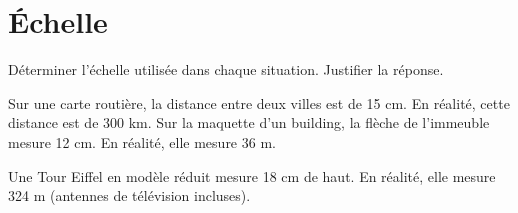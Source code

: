 
\section{\'Echelle}

Déterminer l’échelle utilisée dans chaque situation. Justifier la réponse.

\begin{questions}
	\question Sur une carte routière, la distance entre deux villes est de 15 cm. En réalité, cette distance est de 300 km.
	\question Sur la maquette d’un building, la flèche de l’immeuble mesure 12 cm. En réalité, elle mesure 36 m.
	
	
	\question Une Tour Eiffel en modèle réduit mesure 18 cm de haut. En réalité, elle mesure 324 m (antennes de télévision incluses).
\end{questions}

